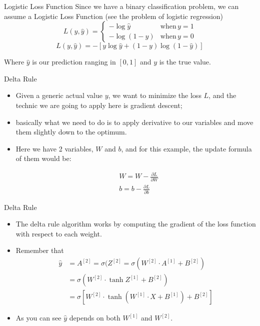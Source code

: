 \documentclass[11pt]{beamer}
\newcommand{\highlight}[1]{%
  \colorbox{yellow!100}{$\displaystyle#1$}}
\begin{document}
\begin{frame}{Logistic Loss Function}
Since we have a binary classification problem, we can assume a Logistic Loss Function (see the problem of logistic regression)
\begin{equation}
L(y, \hat{y}) = 
\begin{cases} 
-\log{\hat{y}} & \text{when}\, y = 1 \\ -\log(1 - \hat{y}) & \text{when}\, y = 0 
\end{cases} 
\end{equation}
$$ L(y, \hat{y}) = -[y\log{\hat{y}} + (1 - y)\log{(1 - \hat{y})}] $$

Where $\hat y$ is our \highlight{\text{prediction}} ranging in $[0, 1]$ and $y$ is the \highlight{\text{true}} value. 

\end{frame}
\begin{frame}{Delta Rule}
\begin{itemize}
\item Given a generic actual value $y$, we want to minimize the loss $L$, and the technic we are going to apply here is gradient descent; 
\item basically what we need to do is to apply derivative to our variables and move them slightly down to the optimum. 
\item Here we have 2 variables, $W$ and $b$, and for this example, the update formula of them would be:

\begin{align*}
&W = W - \frac{\partial L}{\partial W} \\
&b = b - \frac{\partial L}{\partial b}
\end{align*}

\end{itemize}
\end{frame}
\begin{frame}{Delta Rule}
\begin{itemize}
\item The delta rule algorithm works by computing the gradient of the loss function with respect to each weight. 
\item Remember that
\begin{align*}
\hat y &= A^{[2]} = \sigma(Z^{[2]} = \sigma \left( W^{[2]} \cdot A^{[1]} + B^{[2]} \right) \\
&= \sigma \left( W^{[2]} \cdot \tanh{Z^{[1]}} + B^{[2]} \right) \\
&= \sigma \left[ W^{[2]} \cdot \tanh\left( W^{[1]} \cdot X + B^{[1]} \right) + B^{[2]} \right]
\end{align*}
\item As you can see $\hat y$ depends on both $W^{[1]}$ and $W^{[2]}$. 
\end{itemize}
\end{frame}
\end{document}
